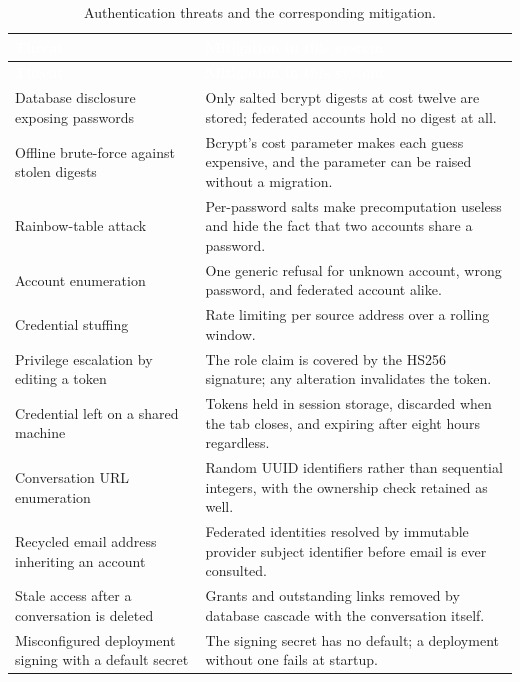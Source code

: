 \begin{longtable}{|p{}|p{}|}
\caption{Authentication threats and the corresponding mitigation.}\label{tab:threatmodel}\\
\hline
\rowcolor{myblue}\textcolor{white}{\textbf{Threat}} & \textcolor{white}{\textbf{Mitigation in this system}} \\
\hline
\endfirsthead
\hline
\rowcolor{myblue}\textcolor{white}{\textbf{Threat}} & \textcolor{white}{\textbf{Mitigation in this system}} \\
\hline
\endhead
Database disclosure exposing passwords & Only salted bcrypt digests at cost twelve are stored; federated accounts hold no digest at all. \\ \hline
Offline brute-force against stolen digests & Bcrypt's cost parameter makes each guess expensive, and the parameter can be raised without a migration. \\ \hline
Rainbow-table attack & Per-password salts make precomputation useless and hide the fact that two accounts share a password. \\ \hline
Account enumeration & One generic refusal for unknown account, wrong password, and federated account alike. \\ \hline
Credential stuffing & Rate limiting per source address over a rolling window. \\ \hline
Privilege escalation by editing a token & The role claim is covered by the HS256 signature; any alteration invalidates the token. \\ \hline
Credential left on a shared machine & Tokens held in session storage, discarded when the tab closes, and expiring after eight hours regardless. \\ \hline
Conversation URL enumeration & Random UUID identifiers rather than sequential integers, with the ownership check retained as well. \\ \hline
Recycled email address inheriting an account & Federated identities resolved by immutable provider subject identifier before email is ever consulted. \\ \hline
Stale access after a conversation is deleted & Grants and outstanding links removed by database cascade with the conversation itself. \\ \hline
Misconfigured deployment signing with a default secret & The signing secret has no default; a deployment without one fails at startup. \\ \hline
\end{longtable}

